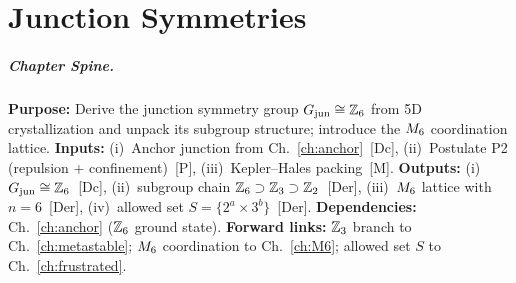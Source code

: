 
\chapter{Junction Symmetries}
\label{ch:junction}


\EDCPolicyLockSentence

\begin{abstract}
How does the $\Zsix$ symmetry of the \AnchorJunction\ emerge from 5D topology?
This chapter formalizes the crystallization mechanism: boundary conditions on
$\Sfive$ select discrete symmetry groups via packing constraints. We derive
the subgroup chain $\Zsix \supset \Zthree \supset \Ztwo$ and interpret each
sector in EDC-native terms. The chapter closes by introducing the $\Msix$
coordination lattice---the dual graph of the Steiner junction network---which
bridges to the coordination and \Frustration\ framework of later chapters.
\end{abstract}

\paragraph{Chapter Spine.}
\textbf{Purpose:} Derive the junction symmetry group $G_{\text{jun}} \cong \mathbb{Z}_6$
from 5D crystallization and unpack its subgroup structure; introduce the
$\Msix$ coordination lattice.
\textbf{Inputs:} (i)~Anchor junction from Ch.~\ref{ch:anchor}~[Dc],
(ii)~Postulate P2 (repulsion + confinement)~[P], (iii)~Kepler--Hales packing~[M].
\textbf{Outputs:} (i)~$G_{\text{jun}} \cong \mathbb{Z}_6$~[Dc], (ii)~subgroup chain
$\Zsix \supset \Zthree \supset \Ztwo$~[Der], (iii)~$\Msix$ lattice with $n=6$~[Der],
(iv)~allowed set $S = \{2^a \times 3^b\}$~[Der].
\textbf{Dependencies:} Ch.~\ref{ch:anchor} ($\Zsix$ ground state).
\textbf{Forward links:} $\mathbb{Z}_3$ branch to Ch.~\ref{ch:metastable};
$\Msix$ coordination to Ch.~\ref{ch:M6}; allowed set $S$ to Ch.~\ref{ch:frustrated}.

